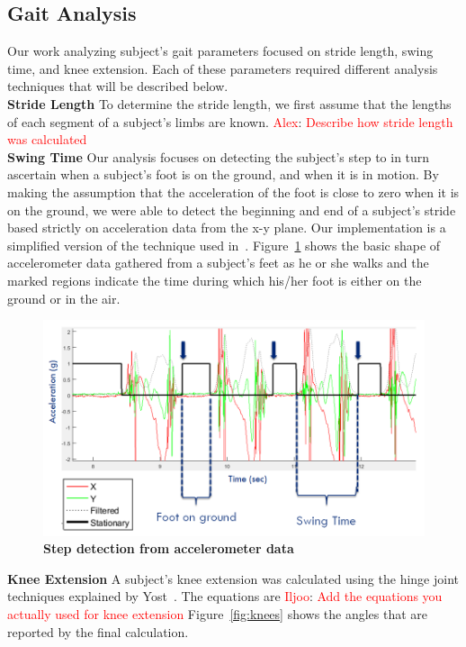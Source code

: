 \documentclass[conference]{IEEEtran}
\newcommand{\utodo}[2]{ {\textcolor{red} {#1}}: {\textcolor{red} {#2}}}
\begin{document}
\subsection{Gait Analysis}
Our work analyzing subject's gait parameters focused on stride length, swing time, and
knee extension. Each of these parameters required different analysis techniques that will
be described below.\\ 
{\bf Stride Length} To determine the stride length, we first assume that the lengths of each
segment of a subject's limbs are known. \utodo{Alex}{Describe how stride length was
calculated}
\\
{\bf Swing Time} Our analysis focuses on detecting the subject's step to in turn ascertain
when a subject's foot is on the ground, and when it is in motion. By making the assumption
that the acceleration of the foot is close to zero when it is on the ground, we were able
to detect the beginning and end of a subject's stride based strictly on acceleration data
from the x-y plane. Our implementation is a simplified version of the technique used
in~\cite{fancy}. Figure~\ref{fig:step-detect} shows the basic shape of accelerometer data
gathered from a subject's feet as he or she walks and the marked regions indicate the time
during which his/her foot is either on the ground or in the air. \\
\begin{figure}[h]
  \centering
  \includegraphics[width=0.8\columnwidth]{figs/swing}
  \caption{{\bf Step detection from accelerometer data}}
  \label{fig:step-detect}
\end{figure}
{\bf Knee Extension} A subject's knee extension was calculated using the hinge joint
techniques explained by Yost~\cite{yost}. The equations are \utodo{Iljoo}{Add the
equations you actually used for knee extension} Figure~\ref{fig:knees} shows the angles
that are reported by the final calculation. 
\end{document}
